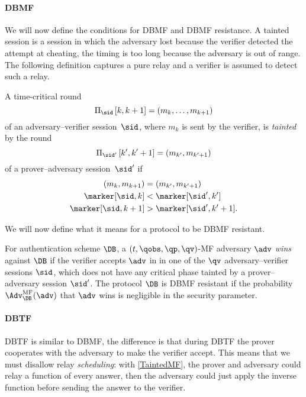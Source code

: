 \paragraph*{\Acl*{DBMF}}

We will now define the conditions for \ac{DBMF} and \ac{DBMF} resistance.
A tainted session is a session in which the adversary lost because the verifier 
detected the attempt at cheating, \eg the timing is too long because the 
adversary is out of range.
The following definition captures a pure relay and a verifier is assumed to 
detect such a relay.

\begin{definition}%
  \label{TaintedMF}
  A time-critical round \[
    \Xscript{\sid}{k, k+1} = (m_k, \dotsc, m_{k+1})
  \] of an adversary--verifier session~\(\sid\), where \(m_k\) is sent by the 
  verifier, is \emph{tainted} by the round \[
    \Xscript{\sid'}{k', k'+1} = (m_{k'}, m_{k'+1})
  \] of a prover--adversary session~\(\sid'\) if
  \begin{align*}
    (m_k, m_{k+1}) &= (m_{k'}, m_{k'+1}) \\
    \marker[\sid, k] &< \marker[\sid', k'] \\
    \marker[\sid, k+1] &> \marker[\sid', k'+1].
  \end{align*}
\end{definition}

We will now define what it means for a protocol to be \ac{DBMF} resistant.

\begin{definition}%
  \label{MFresistance}
  For  authentication scheme \(\DB\), a \((t, \qobs, \qp, \qv)\)-MF 
  adversary \(\adv\) \emph{wins} against \(\DB\) if the verifier accepts 
  \(\adv\) in in one of the \(\qv\) adversary--verifier sessions \(\sid\), 
  which does not have any critical phase tainted by a prover--adversary session 
  \(\sid'\).
  The protocol \(\DB\) is \Ac{DBMF} resistant if the probability 
  \(\Adv_{\DB}^{\text{MF}}(\adv)\) that \(\adv\) wins is negligible in the 
  security parameter.
\end{definition}

\paragraph*{\Acl*{DBTF}}

\Acl{DBTF} is similar to \ac{DBMF}, the difference is that during \ac{DBTF} the 
prover cooperates with the adversary to make the verifier accept.
This means that we must disallow relay \emph{scheduling}: with 
\cref{TaintedMF}, the prover and adversary could relay a function of every 
answer, then the adversary could just apply the inverse function before sending 
the answer to the verifier.

